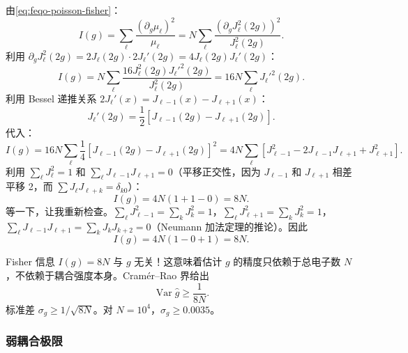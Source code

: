 由\cref{eq:feqo-poisson-fisher}：
\begin{equation}
I(g)=\sum_\ell\frac{(\partial_g\mu_\ell)^2}{\mu_\ell}
=N\sum_\ell\frac{(\partial_g J_\ell^2(2g))^2}{J_\ell^2(2g)}.
\label{eq:feqo-fisher-g}
\end{equation}
利用 $\partial_g J_\ell^2(2g)=2J_\ell(2g)\cdot 2J_\ell'(2g)=4J_\ell(2g)J_\ell'(2g)$：
\begin{equation}
I(g)=N\sum_\ell\frac{16J_\ell^2(2g)J_\ell'^2(2g)}{J_\ell^2(2g)}
=16N\sum_\ell J_\ell'^2(2g).
\label{eq:feqo-fisher-g-simplified}
\end{equation}
利用 Bessel 递推关系 $2J_\ell'(x)=J_{\ell-1}(x)-J_{\ell+1}(x)$：
\begin{equation}
J_\ell'(2g)=\frac{1}{2}[J_{\ell-1}(2g)-J_{\ell+1}(2g)].
\label{eq:feqo-bessel-derivative}
\end{equation}
代入：
\begin{equation}
I(g)=16N\sum_\ell\frac{1}{4}[J_{\ell-1}(2g)-J_{\ell+1}(2g)]^2
=4N\sum_\ell[J_{\ell-1}^2-2J_{\ell-1}J_{\ell+1}+J_{\ell+1}^2].
\label{eq:feqo-fisher-g-expanded}
\end{equation}
利用 $\sum_\ell J_\ell^2=1$ 和 $\sum_\ell J_{\ell-1}J_{\ell+1}=0$（平移正交性，因为 $J_{\ell-1}$ 和 $J_{\ell+1}$ 相差平移 2，而 $\sum J_\ell J_{\ell+k}=\delta_{k0}$）：
\begin{equation}
I(g)=4N(1+1-0)=8N.
\label{eq:feqo-fisher-g-final}
\end{equation}
等一下，让我重新检查。$\sum_\ell J_{\ell-1}^2=\sum_k J_k^2=1$，$\sum_\ell J_{\ell+1}^2=\sum_k J_k^2=1$，$\sum_\ell J_{\ell-1}J_{\ell+1}=\sum_k J_k J_{k+2}=0$（Neumann 加法定理的推论）。因此
\begin{equation}
I(g)=4N(1-0+1)=8N.
\label{eq:feqo-fisher-g-result}
\end{equation}

\begin{note}
Fisher 信息 $I(g)=8N$ 与 $g$ 无关！这意味着估计 $g$ 的精度只依赖于总电子数 $N$，不依赖于耦合强度本身。Cram\'er--Rao 界给出
\begin{equation}
\operatorname{Var}\hat{g}\geq\frac{1}{8N}.
\label{eq:feqo-cr-g}
\end{equation}
标准差 $\sigma_g\geq 1/\sqrt{8N}$。对 $N=10^4$，$\sigma_g\geq 0.0035$。

\end{note}

\subsubsection{弱耦合极限}

